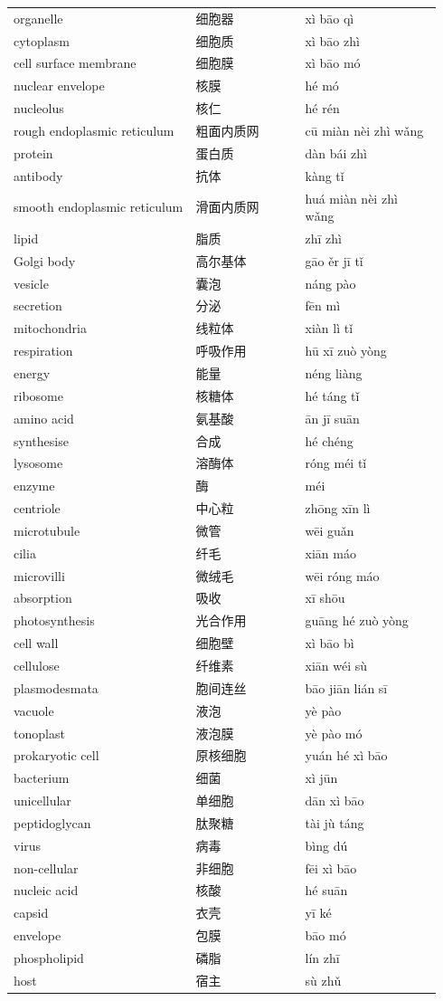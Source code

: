 \documentclass[11pt]{article}
\begin{document}
\begin{longtable}{@{}p{0.40\linewidth}p{0.24\linewidth}p{0.30\linewidth}@{}}
organelle & 细胞器 & xì bāo qì \\
cytoplasm & 细胞质 & xì bāo zhì \\
cell surface membrane & 细胞膜 & xì bāo mó \\
nuclear envelope & 核膜 & hé mó \\
nucleolus & 核仁 & hé rén \\
rough endoplasmic reticulum & 粗面内质网 & cū miàn nèi zhì wǎng \\
protein & 蛋白质 & dàn bái zhì \\
antibody & 抗体 & kàng tǐ \\
smooth endoplasmic reticulum & 滑面内质网 & huá miàn nèi zhì wǎng \\
lipid & 脂质 & zhī zhì \\
Golgi body & 高尔基体 & gāo ěr jī tǐ \\
vesicle & 囊泡 & náng pào \\
secretion & 分泌 & fēn mì \\
mitochondria & 线粒体 & xiàn lì tǐ \\
respiration & 呼吸作用 & hū xī zuò yòng \\
energy & 能量 & néng liàng \\
ribosome & 核糖体 & hé táng tǐ \\
amino acid & 氨基酸 & ān jī suān \\
synthesise & 合成 & hé chéng \\
lysosome & 溶酶体 & róng méi tǐ \\
enzyme & 酶 & méi \\
centriole & 中心粒 & zhōng xīn lì \\
microtubule & 微管 & wēi guǎn \\
cilia & 纤毛 & xiān máo \\
microvilli & 微绒毛 & wēi róng máo \\
absorption & 吸收 & xī shōu \\
photosynthesis & 光合作用 & guāng hé zuò yòng \\
cell wall & 细胞壁 & xì bāo bì \\
cellulose & 纤维素 & xiān wéi sù \\
plasmodesmata & 胞间连丝 & bāo jiān lián sī \\
vacuole & 液泡 & yè pào \\
tonoplast & 液泡膜 & yè pào mó \\
prokaryotic cell & 原核细胞 & yuán hé xì bāo \\
bacterium & 细菌 & xì jūn \\
unicellular & 单细胞 & dān xì bāo \\
peptidoglycan & 肽聚糖 & tài jù táng \\
virus & 病毒 & bìng dú \\
non-cellular & 非细胞 & fēi xì bāo \\
nucleic acid & 核酸 & hé suān \\
capsid & 衣壳 & yī ké \\
envelope & 包膜 & bāo mó \\
phospholipid & 磷脂 & lín zhī \\
host & 宿主 & sù zhǔ \\
\end{longtable}
\end{document}
